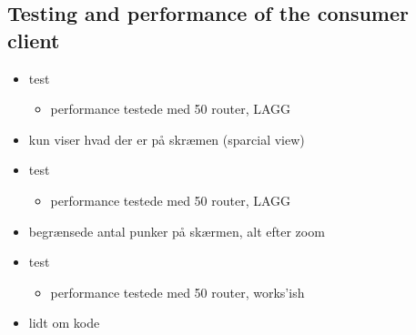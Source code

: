 \subsection{Testing and performance of the consumer client}\label{ssec:test_and_performance_consumer_client}


\begin{itemize}
    \item test
    \begin{itemize}
        \item performance testede med 50 router, LAGG
    \end{itemize}

    \item kun viser hvad der er på skræmen (sparcial view)

    \item test
    \begin{itemize}
        \item performance testede med 50 router, LAGG
    \end{itemize}

    \item begrænsede antal punker på skærmen, alt efter zoom

    \item test
    \begin{itemize}
        \item performance testede med 50 router, works'ish
    \end{itemize}

    \item lidt om kode
\end{itemize}

